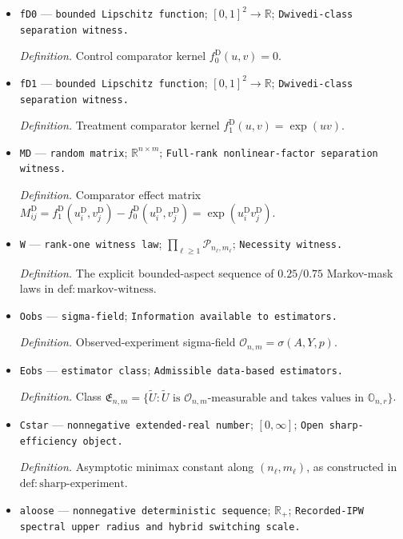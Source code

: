 \documentclass{article}
\begin{document}
\begin{itemize}
  \item \texttt{fD0} --- \texttt{bounded Lipschitz function}; \([0,1]^2\to\mathbb R\); \texttt{Dwivedi-\allowbreak{}class separation witness.}
  \par\smallskip\noindent\emph{Definition.} Control comparator kernel \(f^{\mathrm D}_0(u,v)=0\).
  \item \texttt{fD1} --- \texttt{bounded Lipschitz function}; \([0,1]^2\to\mathbb R\); \texttt{Dwivedi-\allowbreak{}class separation witness.}
  \par\smallskip\noindent\emph{Definition.} Treatment comparator kernel \(f^{\mathrm D}_1(u,v)=\exp(uv)\).
  \item \texttt{MD} --- \texttt{random matrix}; \(\mathbb R^{n\times m}\); \texttt{Full-\allowbreak{}rank nonlinear-\allowbreak{}factor separation witness.}
  \par\smallskip\noindent\emph{Definition.} Comparator effect matrix \(M^{\mathrm D}_{ij}=f^{\mathrm D}_1(u^{\mathrm D}_i,v^{\mathrm D}_j)-f^{\mathrm D}_0(u^{\mathrm D}_i,v^{\mathrm D}_j)=\exp(u^{\mathrm D}_iv^{\mathrm D}_j)\).
  \item \texttt{W} --- \texttt{rank-\allowbreak{}one witness law}; \(\prod_{\ell\ge1}\mathcal P_{n_\ell,m_\ell}\); \texttt{Necessity witness.}
  \par\smallskip\noindent\emph{Definition.} The explicit bounded-aspect sequence of \(0.25/0.75\) Markov-mask laws in \(\mathrm{def:markov\mbox{-}witness}\).
  \item \texttt{Oobs} --- \texttt{sigma-\allowbreak{}field}; \texttt{Information available to estimators.}
  \par\smallskip\noindent\emph{Definition.} Observed-experiment sigma-field \(\mathcal O_{n,m}=\sigma(A,Y,p)\).
  \item \texttt{Eobs} --- \texttt{estimator class}; \texttt{Admissible data-\allowbreak{}based estimators.}
  \par\smallskip\noindent\emph{Definition.} Class \(\mathfrak E_{n,m}=\{\widetilde U:\widetilde U\text{ is }\mathcal O_{n,m}\text{-measurable and takes values in }\mathbb O_{n,r}\}\).
  \item \texttt{Cstar} --- \texttt{nonnegative extended-\allowbreak{}real number}; \([0,\infty]\); \texttt{Open sharp-\allowbreak{}efficiency object.}
  \par\smallskip\noindent\emph{Definition.} Asymptotic minimax constant along \((n_\ell,m_\ell)\), as constructed in \(\mathrm{def:sharp\mbox{-}experiment}\).
  \item \texttt{aloose} --- \texttt{nonnegative deterministic sequence}; \(\mathbb R_+\); \texttt{Recorded-\allowbreak{}IPW spectral upper radius and hybrid switching scale.}

\end{itemize}
\end{document}

